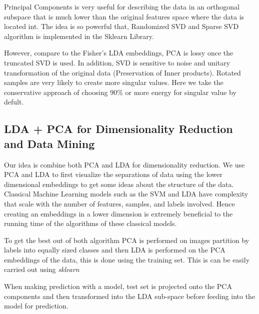 \documentclass{article}
\begin{document}
        \par
        Principal Components is very useful for describing the data in an orthogonal subspace that is much lower than the original features space where the data is located int. The idea is so powerful that, Randomized SVD and Sparse SVD algorithm is implemented in the Sklearn Library. %
        \par
        However, compare to the Fisher's LDA embeddings, PCA is lossy once the truncated SVD is used. In addition, SVD is sensitive to noise and unitary transformation of the original data (Preservation of Inner products). Rotated samples are very likely to create more singular values. Here we take the conservative approach of choosing 90\% or more energy for singular value by defult. 
    \subsection*{LDA + PCA for Dimensionality Reduction and Data Mining}
        \hspace{1.1em}
        Our idea is combine both PCA and LDA for dimensionality reduction. We use PCA and LDA to first visualize the separations of data using the lower dimensional embeddings to get some ideas about the structure of the data. Classical Machine Learning models such as the SVM and LDA have complexity that scale with the number of features, samples, and labels involved. Hence creating an embeddings in a lower dimension is extremely beneficial to the running time of the algorithms of these classical models. 
        \par
        To get the best out of both algorithm PCA is performed on images partition by labels into equally sized classes and then LDA is performed on the PCA embeddings of the data, this is done using the training set. This is can be easily carried out using \textit{sklearn}
        \par
        When making prediction with a model, test set is projected onto the PCA components and then transformed into the LDA sub-space before feeding into the model for prediction.
\end{document}
